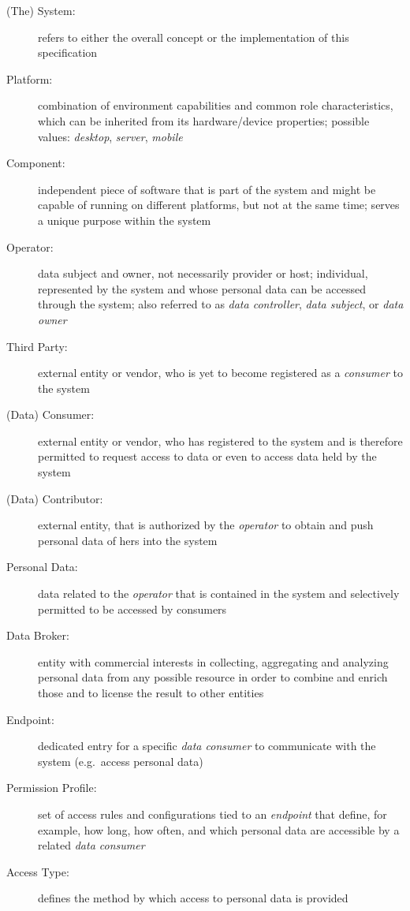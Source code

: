 \documentclass[12pt,english,a4paper,titlepage,cleardoublepage=empty,dottedtoc]{report}
\begin{document}
\begin{description}
\item[\protect\hypertarget{spec_term_system}{}{(The) System}:]
refers to either the overall concept or the implementation of this
specification
\item[\protect\hypertarget{spec_term_platform}{}{Platform}:]
combination of environment capabilities and common role characteristics,
which can be inherited from its hardware/device properties; possible
values: \emph{desktop}, \emph{server}, \emph{mobile}
\item[\protect\hypertarget{spec_term_component}{}{Component}:]
independent piece of software that is part of the system and might be
capable of running on different platforms, but not at the same time;
serves a unique purpose within the system
\item[\protect\hypertarget{spec_term_operator}{}{Operator}:]
data subject and owner, not necessarily provider or host; individual,
represented by the system and whose personal data can be accessed
through the system; also referred to as \emph{data controller},
\emph{data subject}, or \emph{data owner}
\item[\protect\hypertarget{spec_term_third-party}{}{Third Party}:]
external entity or vendor, who is yet to become registered as a
\emph{consumer} to the system
\item[\protect\hypertarget{spec_term_consumer}{}{(Data) Consumer}:]
external entity or vendor, who has registered to the system and is
therefore permitted to request access to data or even to access data
held by the system
\item[\protect\hypertarget{spec_term_contributor}{}{(Data)
Contributor}:]
external entity, that is authorized by the \emph{operator} to obtain and
push personal data of hers into the system
\item[\protect\hypertarget{spec_term_personal-data}{}{Personal Data}:]
data related to the \emph{operator} that is contained in the system and
selectively permitted to be accessed by consumers
\item[\protect\hypertarget{spec_term_data-broker}{}{Data Broker}:]
entity with commercial interests in collecting, aggregating and
analyzing personal data from any possible resource in order to combine
and enrich those and to license the result to other entities
\item[\protect\hypertarget{spec_term_endpoint}{}{Endpoint}:]
dedicated entry for a specific \emph{data consumer} to communicate with
the system (e.g.~access personal data)
\item[\protect\hypertarget{spec_term_permission-profile}{}{Permission
Profile}:]
set of access rules and configurations tied to an \emph{endpoint} that
define, for example, how long, how often, and which personal data are
accessible by a related \emph{data consumer}
\item[\protect\hypertarget{spec_term_access-type}{}{Access Type}:]
defines the method by which access to personal data is provided
\end{description}
\end{document}

